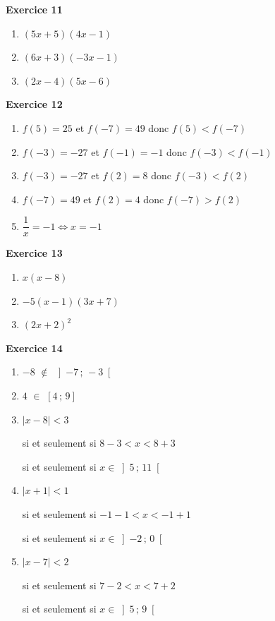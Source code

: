 \documentclass[12pt,a4paper,french]{article}
\begin{document}
\noindent\textbf{Exercice 11}\par
\smallskip
\begin{enumerate}
\item $(5x + 5)(4x - 1)$
\item $(6x + 3)(-3x - 1)$
\item $(2x - 4)(5x - 6)$
\end{enumerate}
\medskip

\noindent\textbf{Exercice 12}\par
\smallskip
\begin{enumerate}
\item $f(5) = 25$ et $f(-7) = 49$ donc $f(5) < f(-7)$
\item $f(-3) = -27$ et $f(-1) = -1$ donc $f(-3) < f(-1)$
\item $f(-3) = -27$ et $f(2) = 8$ donc $f(-3) < f(2)$
\item $f(-7) = 49$ et $f(2) = 4$ donc $f(-7) > f(2)$
\item $\dfrac{1}{x} = -1 \Longleftrightarrow x = -1$
\end{enumerate}
\medskip

\noindent\textbf{Exercice 13}\par
\smallskip
\begin{enumerate}
\item $x(x - 8)$
\item $-5(x - 1)(3x + 7)$
\item $(2x + 2)^2$
\end{enumerate}
\medskip

\noindent\textbf{Exercice 14}\par
\smallskip
\begin{enumerate}
\item $-8$ $\notin$ $\left] -7 \,;\, -3 \right[$
\item $4$ $\in$ $\left[ 4 \,;\, 9 \right]$
\item $|x - 8| < 3$

si et seulement si $8 - 3 < x < 8 + 3$

si et seulement si $x \in \left] 5 \,;\, 11 \right[$
\item $|x + 1| < 1$

si et seulement si $-1 - 1 < x < -1 + 1$

si et seulement si $x \in \left] -2 \,;\, 0 \right[$
\item $|x - 7| < 2$

si et seulement si $7 - 2 < x < 7 + 2$

si et seulement si $x \in \left] 5 \,;\, 9 \right[$
\end{enumerate}
\medskip
\end{document}
